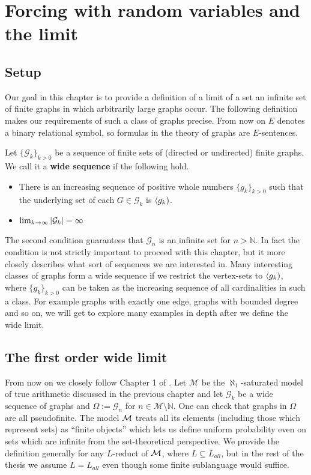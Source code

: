 \chapter{Forcing with random variables and the limit}\label{chapwidelimit}
\section{Setup}

Our goal in this chapter is to provide a definition of a limit of a set an infinite set of finite graphs in which arbitrarily large graphs occur. The following definition makes our requirements of such a class of graphs precise. From now on $E$ denotes a binary relational symbol, so formulas in the theory of graphs are $E$-sentences.

\begin{defi}
Let $\{\mathcal{G}_k\}_{k>0}$ be a sequence of finite sets of (directed or undirected) finite graphs. We call it a \textbf{wide sequence} if the following hold.

\begin{itemize}
\item There is an increasing sequence of positive whole numbers $\{g_k\}_{k>0}$ such that the underlying set of each $G\in\mathcal{G}_k$ is $\langle g_k)$.
\item $\lim_{k\to\infty} \left|{\mathcal{G}_k}\right|=\infty$
\end{itemize}
\end{defi}

The second condition guarantees that $\mathcal{G}_n$ is an infinite set for $n>\mathbb{N}$. In fact the condition is not strictly important to proceed with this chapter, but it more closely describes what sort of sequences we are interested in. Many interesting classes of graphs form a wide sequence if we restrict the vertex-sets to $\langle g_k)$, where $\{g_k\}_{k>0}$ can be taken as the increasing sequence of all cardinalities in such a class. For example graphs with exactly one edge, graphs with bounded degree and so on, we will get to explore many examples in depth after we define the wide limit.

\section{The first order wide limit}

From now on we closely follow Chapter 1 of \cite{krajicek2010forcing}. Let $\mathcal{M}$ be the $\aleph_1$-saturated model of true arithmetic discussed in the previous chapter and let $\mathcal{G}_k$ be a wide sequence of graphs and $\Omega:=\mathcal{G}_n$ for $n\in\mathcal{M}\setminus \mathbb{N}$. One can check that graphs in $\Omega$ are all pseudofinite. The model $\mathcal{M}$ treats all its elements (including those which represent sets) as ``finite objects'' which lets us define uniform probability even on sets which are infinite from the set-theoretical perspective. We provide the definition generally for any $L$-reduct of $\mathcal{M}$, where $L\subseteq L_{all}$, but in the rest of the thesis we assume $L=L_{all}$ even though some finite sublanguage would suffice.


